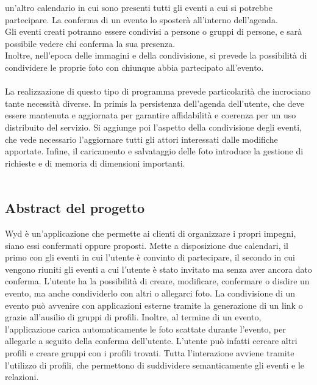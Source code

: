 un'altro calendario in cui sono presenti tutti gli eventi a cui si potrebbe partecipare. 
La conferma di un evento lo sposterà all'interno dell'agenda.\\
Gli eventi creati potranno essere condivisi a persone o gruppi di persone, e sarà possibile vedere chi conferma la sua presenza.\\
Inoltre, nell'epoca delle immagini e della condivisione, si prevede la possibilità di condividere le proprie foto con chiunque abbia partecipato all'evento.\\
\\
La realizzazione di questo tipo di programma prevede particolarità che incrociano tante necessità diverse.
In primis la persistenza dell'agenda dell'utente, che deve essere mantenuta e aggiornata per garantire affidabilità e coerenza per un uso distribuito del servizio.
Si aggiunge poi l'aspetto della condivisione degli eventi, che vede necessario l'aggiornare tutti gli attori interessati dalle modifiche apportate.
Infine, il caricamento e salvataggio delle foto introduce la gestione di richieste e di memoria di dimensioni importanti.\\
\\
\clearpage

\subsection{Abstract del progetto}

Wyd è un'applicazione che permette ai clienti di organizzare i propri impegni, siano essi confermati oppure proposti.\newline
Mette a disposizione due calendari, il primo con gli eventi in cui l'utente è convinto di partecipare, 
il secondo in cui vengono riuniti gli eventi a cui l'utente è stato invitato ma senza aver ancora dato conferma.\newline
L'utente ha la possibilità di creare, modificare, confermare o disdire un evento, ma anche condividerlo con altri o allegarci foto.
La condivisione di un evento può avvenire con applicazioni esterne tramite la generazione di un link o grazie all'ausilio di gruppi di profili.
Inoltre, al termine di un evento, l'applicazione carica automaticamente le foto scattate durante l'evento, per allegarle a seguito della conferma dell'utente.\newline  
L'utente può infatti cercare altri profili e creare gruppi con i profili trovati.\newline
Tutta l'interazione avviene tramite l'utilizzo di profili, che permettono di suddividere semanticamente gli eventi e le relazioni.\newline

\newpage